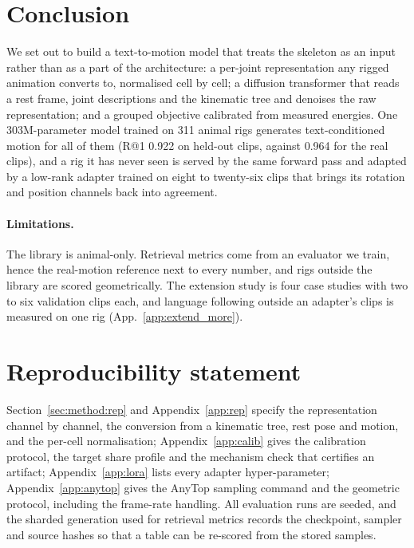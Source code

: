 \section{Conclusion}\label{sec:conclusion}

We set out to build a text-to-motion model that treats the skeleton as an input rather than as a
part of the architecture: a per-joint representation any rigged animation converts to, normalised
cell by cell; a diffusion transformer that reads a rest frame, joint descriptions and the kinematic
tree and denoises the raw representation; and a grouped objective calibrated from measured
energies. One \num{303}M-parameter model trained on \num{311} animal rigs generates text-conditioned
motion for all of them (R@1 \num{0.922} on held-out clips, against \num{0.964} for the real
clips), and a rig it has never seen is served by the same forward pass and adapted by a low-rank adapter trained on eight to twenty-six
clips that brings its rotation and position channels back into agreement.

\paragraph{Limitations.} The library is animal-only. Retrieval metrics come from an evaluator we
train, hence the real-motion reference next to every number, and rigs outside the library are
scored geometrically. The extension study is four case studies with two to six
validation clips each, and language following outside an adapter's clips is measured on one rig (App.~\ref{app:extend_more}).

\section*{Reproducibility statement}

Section~\ref{sec:method:rep} and Appendix~\ref{app:rep} specify the representation channel by
channel, the conversion from a kinematic tree, rest pose and motion, and the per-cell
normalisation; Appendix~\ref{app:calib} gives the calibration protocol, the target share profile
and the mechanism check that certifies an artifact; Appendix~\ref{app:lora} lists every adapter
hyper-parameter; Appendix~\ref{app:anytop} gives the AnyTop sampling command and the geometric
protocol, including the frame-rate handling. All evaluation runs are seeded, and the sharded
generation used for retrieval metrics records the checkpoint, sampler and source hashes so that
a table can be re-scored from the stored samples.

